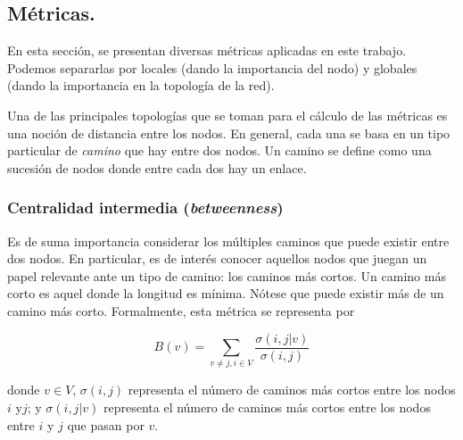 \documentclass[../main.tex]{subfiles}
\begin{document}





\subsection{ Métricas.}

En esta sección, se presentan diversas métricas aplicadas en este trabajo. Podemos separarlas por locales (dando la importancia del nodo) y globales (dando la importancia en la topología de la red).

Una de las principales topologías que se toman para el cálculo de las métricas es una noción de distancia entre los nodos. En general, cada una se basa en un tipo particular  de \textit{camino} que hay entre dos nodos. Un camino se define como una sucesión de nodos donde entre cada dos hay un enlace.

\subsubsection{Centralidad intermedia  (\textit{betweenness}) }

Es de suma importancia considerar los múltiples caminos que puede existir entre dos nodos. En particular, es de interés conocer aquellos nodos que juegan un papel relevante ante un tipo de camino: los caminos más cortos. Un camino más corto es aquel donde la longitud es mínima. Nótese que puede existir más de un camino más corto.
Formalmente, esta métrica se representa por

\begin{equation}
    \label{eq:betweennes}
    B(v) = \sum_{v \neq j, i \in V} \frac{ \sigma( i,j | v) }{\sigma( i,j)}
\end{equation}

donde $v \in V$, $\sigma(i,j)$ representa el número de caminos más cortos entre los nodos $i$ y$j$; y $\sigma(i,j|v)$ representa el número de caminos más cortos entre los nodos  entre $i$ y $j$ que pasan por $v$.
\end{document}
